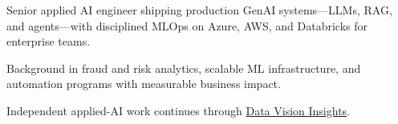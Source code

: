 
{\small\color{cvtext}%
\noindent Senior applied AI engineer shipping production GenAI systems---LLMs, RAG, and agents---with disciplined MLOps on Azure, AWS, and Databricks for enterprise teams.\par
\vspace{0.14em}%
\noindent Background in fraud and risk analytics, scalable ML infrastructure, and automation programs with measurable business impact.\par
\vspace{0.14em}%
\noindent Independent applied-AI work continues through \href{https://datavisioninsights.com/}{Data Vision Insights}.\par
}
